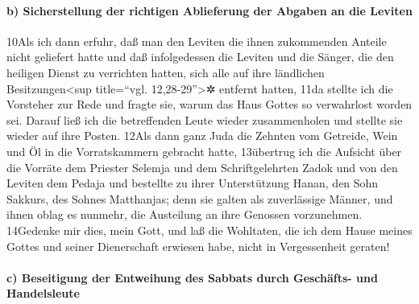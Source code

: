 \hypertarget{b-sicherstellung-der-richtigen-ablieferung-der-abgaben-an-die-leviten}{%
\paragraph{b) Sicherstellung der richtigen Ablieferung der Abgaben an
die
Leviten}\label{b-sicherstellung-der-richtigen-ablieferung-der-abgaben-an-die-leviten}}

10Als ich dann erfuhr, daß man den Leviten die ihnen zukommenden Anteile
nicht geliefert hatte und daß infolgedessen die Leviten und die Sänger,
die den heiligen Dienst zu verrichten hatten, sich alle auf ihre
ländlichen Besitzungen\textless sup title=``vgl. 12,28-29''\textgreater✲
entfernt hatten, 11da stellte ich die Vorsteher zur Rede und fragte sie,
warum das Haus Gottes so verwahrlost worden sei. Darauf ließ ich die
betreffenden Leute wieder zusammenholen und stellte sie wieder auf ihre
Posten. 12Als dann ganz Juda die Zehnten vom Getreide, Wein und Öl in
die Vorratskammern gebracht hatte, 13übertrug ich die Aufsicht über die
Vorräte dem Priester Selemja und dem Schriftgelehrten Zadok und von den
Leviten dem Pedaja und bestellte zu ihrer Unterstützung Hanan, den Sohn
Sakkurs, des Sohnes Matthanjas; denn sie galten als zuverlässige Männer,
und ihnen oblag es nunmehr, die Austeilung an ihre Genossen vorzunehmen.
14Gedenke mir dies, mein Gott, und laß die Wohltaten, die ich dem Hause
meines Gottes und seiner Dienerschaft erwiesen habe, nicht in
Vergessenheit geraten!

\hypertarget{c-beseitigung-der-entweihung-des-sabbats-durch-geschuxe4fts--und-handelsleute}{%
\paragraph{c) Beseitigung der Entweihung des Sabbats durch Geschäfts-
und
Handelsleute}\label{c-beseitigung-der-entweihung-des-sabbats-durch-geschuxe4fts--und-handelsleute}}


